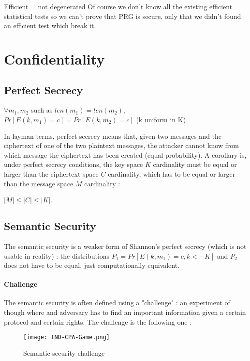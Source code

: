 Efficient = not degenerated
Of course we don't know all the existing efficient statistical tests so we can't prove that PRG is secure, only that we didn't found an efficient test which break it.


\section{Confidentiality}
\subsection{Perfect Secrecy}

\begin{mytheorem}
    $\forall m_1,m_2$ such as $len(m_1) = len(m_2)$, 
    $Pr[E(k,m_1) = c] = Pr[E(k,m_2) = c]$  \flushright (k uniform in K)
\end{mytheorem}

In layman terms, perfect secrecy means that, given two messages and the ciphertext of one of the two plaintext messages, the attacker cannot know from which message the ciphertext has been created (equal probability). A corollary is, under perfect secrecy conditions, the key space $K$ cardinality must be equal or larger than the ciphertext space $C$ cardinality, which has to be equal or larger than the message space $M$ cardinality :
\begin{mytheorem}
    $ |M| \leq |C| \leq |K| $. 
\end{mytheorem}


\subsection{Semantic Security}

The semantic security is a weaker form of Shannon's perfect secrecy (which is not usable in reality) : the distributions $P_1 = Pr[E(k,m_1) = c , k<- K]$ and $P_2$ does not have to be equal, just computationally equivalent.

\paragraph{Challenge}
The semantic security is often defined using a "challenge" : an experiment of though where and adversary has to find an important information given a certain protocol and certain rights. The challenge is the following one :

\begin{figure}[ht!]
	\centering
		\texttt{[image: IND-CPA-Game.png]}
	\caption{Semantic security challenge}
	\label{fig:Cipher}
\end{figure}

